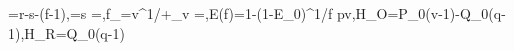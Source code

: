 =r-\kappa s-\gamma(f-1),\qquad {}=s
=,\qquad f_{}=v^{1/\alpha}+\tau_v
=,\qquad E(f)=1-(1-E_0)^{1/f}
p\equiv v,\qquad H_O=P_0(v-1)-Q_0(q-1),\quad H_R=Q_0(q-1)
